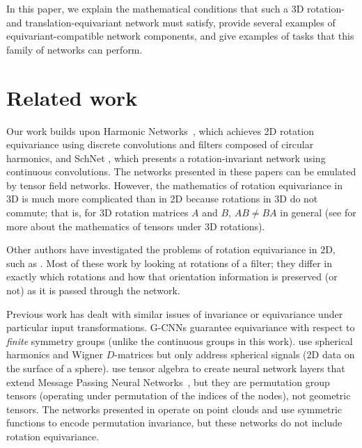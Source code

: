 \documentclass{article}
\begin{document}
In this paper, we explain the mathematical conditions that such a 3D rotation- and translation-equivariant network must satisfy, provide several examples of equivariant-compatible network components, and give examples of tasks that this family of networks can perform.

\section{Related work}

Our work builds upon Harmonic Networks~\citep{Worrall_2017_CVPR}, which achieves 2D rotation equivariance using discrete convolutions and filters composed of circular harmonics, and SchNet \citep{MD17Schutt2017}, which presents a rotation-invariant network using continuous convolutions. %
The networks presented in these papers can be emulated by tensor field networks.  However, the mathematics of rotation equivariance in 3D is much more complicated than in 2D because rotations in 3D do not commute; that is, for 3D rotation matrices $A$ and $B$, $AB \ne BA$ in general (see \citet{reisert2009spherical} for more about the mathematics of tensors under 3D rotations). 

Other authors have investigated the problems of rotation equivariance in 2D, such as 
\citet{2017arXiv170101833Z,DBLP:journals/corr/GonzalezVKT16,2017arXiv170508623L}. Most of these work by looking at rotations of a filter; they differ in exactly which rotations and how that orientation information is preserved (or not) as it is passed through the network.

Previous work has dealt with similar issues of invariance or equivariance under particular input transformations.  G-CNNs \citep{group_equivariant_cnns} guarantee equivariance with respect to \emph{finite} symmetry groups (unlike the continuous groups in this work). \citet{s.2018spherical} use spherical harmonics and Wigner $D$-matrices but only address spherical signals (2D data on the surface of a sphere). \citet{2018arXiv180102144K} use tensor algebra to create neural network layers that extend Message Passing Neural Networks~\citep{pmlr-v70-gilmer17a}, but they are permutation group tensors (operating under permutation of the indices of the nodes), not geometric tensors. The networks presented in \citet{qi2016pointnet,qi2017pointnetplusplus} operate on point clouds and use symmetric functions to encode permutation invariance, but these networks do not include rotation equivariance.
\end{document}

